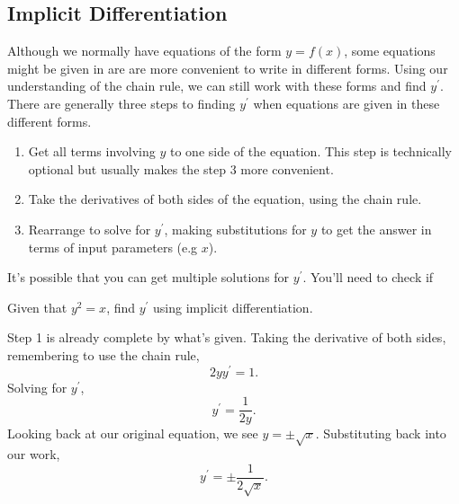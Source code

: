 \subsection{Implicit Differentiation}
Although we normally have equations of the form $y = f(x)$, some equations might be given in are are more convenient to write in different forms.
Using our understanding of the chain rule, we can still work with these forms and find $y^\prime$. There are generally three steps to finding $y^\prime$ when equations are given in these different forms.
\begin{enumerate}
	\item Get all terms involving $y$ to one side of the equation. This step is technically optional but usually makes the step 3 more convenient.
	\item Take the derivatives of both sides of the equation, using the chain rule.
	\item Rearrange to solve for $y^\prime$, making substitutions for $y$ to get the answer in terms of input parameters (e.g $x$).
\end{enumerate}
It's possible that you can get multiple solutions for $y^\prime$.
You'll need to check if 

\begin{example}
	Given that $y^2 = x$, find $y^\prime$ using implicit differentiation.
\end{example}
Step 1 is already complete by what's given.
Taking the derivative of both sides, remembering to use the chain rule,
\begin{equation*}
	2yy^\prime = 1.
\end{equation*}
\indent
Solving for $y^\prime$,
\begin{equation*}
	y^\prime = \frac{1}{2y}.
\end{equation*}
\indent
Looking back at our original equation, we see $y = \pm\sqrt{x}$.
Substituting back into our work,
\begin{equation*}
	y^\prime = \pm\frac{1}{2\sqrt{x}}.
\end{equation*}

